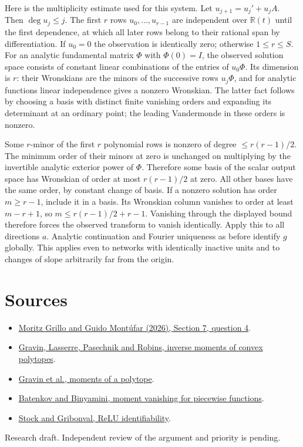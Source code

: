 \documentclass[10pt]{article}
\begin{document}
Here is the multiplicity estimate used for this system. Let $u_{j+1}=u_j'+u_j A$. Then $\deg u_j\le j$. The first $r$ rows $u_0,\ldots,u_{r-1}$ are independent over $\mathbb R(t)$ until the first dependence, at which all later rows belong to their rational span by differentiation. If $u_0=0$ the observation is identically zero; otherwise $1\le r\le S$. For an analytic fundamental matrix $\Phi$ with $\Phi(0)=I$, the observed solution space consists of constant linear combinations of the entries of $u_0\Phi$. Its dimension is $r$: their Wronskians are the minors of the successive rows $u_j\Phi$, and for analytic functions linear independence gives a nonzero Wronskian. The latter fact follows by choosing a basis with distinct finite vanishing orders and expanding its determinant at an ordinary point; the leading Vandermonde in these orders is nonzero.

Some $r$-minor of the first $r$ polynomial rows is nonzero of degree $\le r(r-1)/2$. The minimum order of their minors at zero is unchanged on multiplying by the invertible analytic exterior power of $\Phi$. Therefore some basis of the scalar output space has Wronskian of order at most $r(r-1)/2$ at zero. All other bases have the same order, by constant change of basis. If a nonzero solution has order $m\ge r-1$, include it in a basis. Its Wronskian column vanishes to order at least $m-r+1$, so $m\le r(r-1)/2+r-1$. Vanishing through the displayed bound therefore forces the observed transform to vanish identically. Apply this to all directions $a$. Analytic continuation and Fourier uniqueness as before identify $g$ globally. This applies even to networks with identically inactive units and to changes of slope arbitrarily far from the origin.

\section*{Sources}
\begin{itemize}
\item \href{https://arxiv.org/abs/2605.03601}{Moritz Grillo and Guido Montúfar (2026), Section 7, question 4}.
\item \href{https://arxiv.org/abs/1106.5723}{Gravin, Lasserre, Pasechnik and Robins, inverse moments of convex polytopes}.
\item \href{https://arxiv.org/abs/1210.3193}{Gravin et al., moments of a polytope}.
\item \href{https://arxiv.org/abs/1302.0991}{Batenkov and Binyamini, moment vanishing for piecewise functions}.
\item \href{https://arxiv.org/abs/2107.09370}{Stock and Gribonval, ReLU identifiability}.
\end{itemize}
{\small Research draft. Independent review of the argument and priority is pending.}
\end{document}
